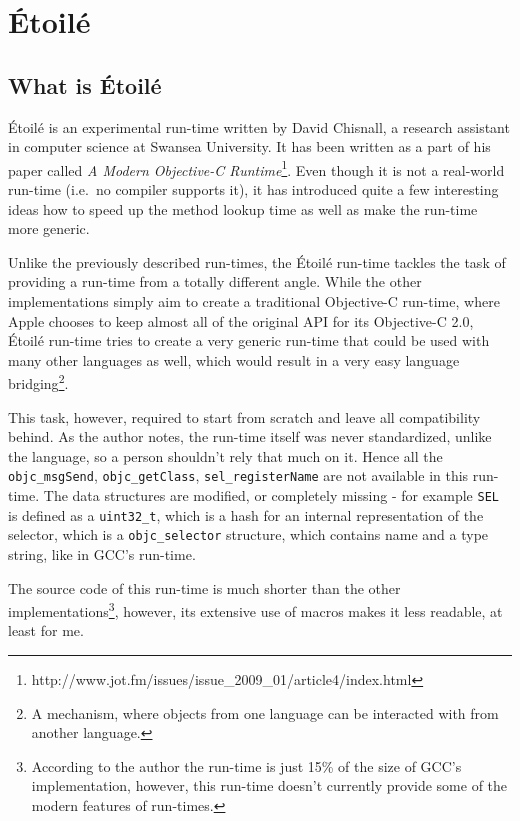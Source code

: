 \chapter{\'Etoil\'e}
\section{What is \'Etoil\'e}

\'Etoil\'e is an experimental run-time written by David Chisnall, a research assistant in computer science at Swansea University. It has been written as a part of his paper called \emph{A Modern Objective-C Runtime}\footnote{http://www.jot.fm/issues/issue\_2009\_01/article4/index.html}. Even though it is not a real-world run-time (i.e.\ no compiler supports it), it has introduced quite a few interesting ideas how to speed up the method lookup time as well as make the run-time more generic.

Unlike the previously described run-times, the \'Etoil\'e run-time tackles the task of providing a run-time from a totally different angle. While the other implementations simply aim to create a traditional Objective-C run-time, where Apple chooses to keep almost all of the original API for its Objective-C 2.0, \'Etoil\'e run-time tries to create a very generic run-time that could be used with many other languages as well, which would result in a very easy language bridging\footnote{A mechanism, where objects from one language can be interacted with from another language.}.

This task, however, required to start from scratch and leave all compatibility behind. As the author notes, the run-time itself was never standardized, unlike the language, so a person shouldn't rely that much on it. Hence all the \verb=objc_msgSend=, \verb=objc_getClass=, \verb=sel_registerName= are not available in this run-time. The data structures are modified, or completely missing - for example \verb=SEL= is defined as a \verb=uint32_t=, which is a hash for an internal representation of the selector, which is a \verb=objc_selector= structure, which contains name and a type string, like in GCC's run-time. 

The source code of this run-time is much shorter than the other implementations\footnote{According to the author the run-time is just 15\% of the size of GCC's implementation, however, this run-time doesn't currently provide some of the modern features of run-times.}, however, its extensive use of macros makes it less readable, at least for me.

